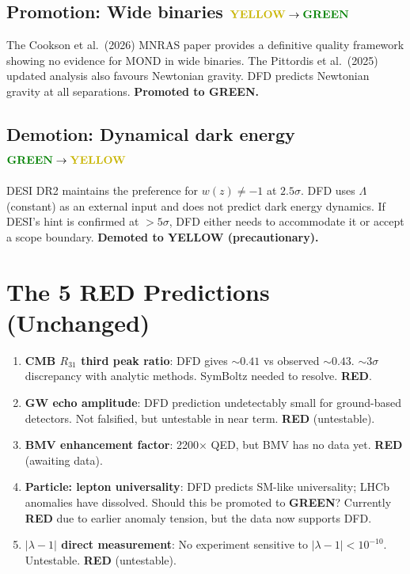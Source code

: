 \documentclass[11pt,a4paper]{article}
\newcommand{\GREEN}{\textcolor{dfdgreen}{\textbf{GREEN}}}
\newcommand{\YELLOW}{\textcolor{dfdyellow}{\textbf{YELLOW}}}
\newcommand{\RED}{\textcolor{dfdred}{\textbf{RED}}}
\begin{document}
\subsection{Promotion: Wide binaries $\YELLOW \to \GREEN$}

The Cookson et al.\ (2026) MNRAS paper provides a definitive quality framework showing no evidence for MOND in wide binaries. The Pittordis et al.\ (2025) updated analysis also favours Newtonian gravity. DFD predicts Newtonian gravity at all separations. \textbf{Promoted to \GREEN.}

\subsection{Demotion: Dynamical dark energy $\GREEN \to \YELLOW$}

DESI DR2 maintains the preference for $w(z) \neq -1$ at $2.5\sigma$. DFD uses $\Lambda$ (constant) as an external input and does not predict dark energy dynamics. If DESI's hint is confirmed at $> 5\sigma$, DFD either needs to accommodate it or accept a scope boundary. \textbf{Demoted to \YELLOW{} (precautionary).}

\section{The 5 RED Predictions (Unchanged)}

\begin{enumerate}
\item \textbf{CMB $R_{31}$ third peak ratio}: DFD gives $\sim 0.41$ vs observed $\sim 0.43$. $\sim 3\sigma$ discrepancy with analytic methods. SymBoltz needed to resolve. \RED.
\item \textbf{GW echo amplitude}: DFD prediction undetectably small for ground-based detectors. Not falsified, but untestable in near term. \RED{} (untestable).
\item \textbf{BMV enhancement factor}: 2200$\times$ QED, but BMV has no data yet. \RED{} (awaiting data).
\item \textbf{Particle: lepton universality}: DFD predicts SM-like universality; LHCb anomalies have dissolved. Should this be promoted to \GREEN? Currently \RED{} due to earlier anomaly tension, but the data now supports DFD.
\item \textbf{$|\lambda - 1|$ direct measurement}: No experiment sensitive to $|\lambda - 1| < 10^{-10}$. Untestable. \RED{} (untestable).
\end{enumerate}
\end{document}
